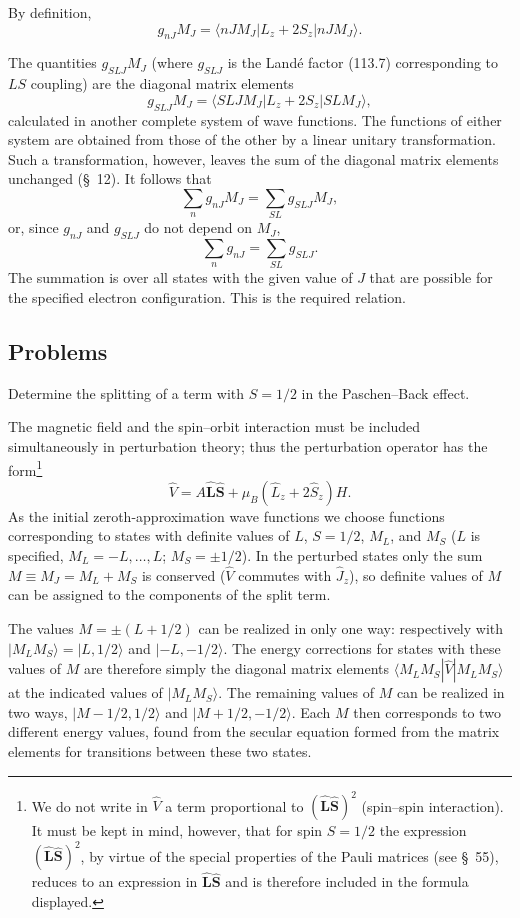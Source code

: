 By definition,
\[
 g_{nJ}M_J=\langle nJM_J|L_z+2S_z|nJM_J\rangle.
\]

The quantities $g_{SLJ}M_J$ (where $g_{SLJ}$ is the Landé factor (113.7) corresponding to $LS$ coupling) are the diagonal matrix elements
\[
 g_{SLJ}M_J=\langle SLJM_J|L_z+2S_z|SLM_J\rangle,
\]
calculated in another complete system of wave functions. The functions of either system are obtained from those of the other by a linear unitary transformation. Such a transformation, however, leaves the sum of the diagonal matrix elements unchanged (§~12). It follows that
\[
 \sum_n g_{nJ}M_J=\sum_{SL}g_{SLJ}M_J,
\]
or, since $g_{nJ}$ and $g_{SLJ}$ do not depend on $M_J$,
\begin{equation}
 \sum_n g_{nJ}=\sum_{SL}g_{SLJ}.
 \tag{113.16}
\end{equation}
The summation is over all states with the given value of $J$ that are possible for the specified electron configuration. This is the required relation.

\subsection*{Problems}

 Determine the splitting of a term with $S=1/2$ in the Paschen--Back effect.

\SolutionHeading The magnetic field and the spin--orbit interaction must be included simultaneously in perturbation theory; thus the perturbation operator has the form\footnote{We do not write in $\hat V$ a term proportional to $(\hat{\mathbf L}\hat{\mathbf S})^2$ (spin--spin interaction). It must be kept in mind, however, that for spin $S=1/2$ the expression $(\hat{\mathbf L}\hat{\mathbf S})^2$, by virtue of the special properties of the Pauli matrices (see §~55), reduces to an expression in $\hat{\mathbf L}\hat{\mathbf S}$ and is therefore included in the formula displayed.}
\[
 \hat V=A\hat{\mathbf L}\hat{\mathbf S}+\mu_B(\hat L_z+2\hat S_z)H.
\]
As the initial zeroth-approximation wave functions we choose functions corresponding to states with definite values of $L$, $S=1/2$, $M_L$, and $M_S$ ($L$ is specified, $M_L=-L,\ldots,L$; $M_S=\pm1/2$). In the perturbed states only the sum $M\equiv M_J=M_L+M_S$ is conserved ($\hat V$ commutes with $\hat J_z$), so definite values of $M$ can be assigned to the components of the split term.

The values $M=\pm(L+1/2)$ can be realized in only one way: respectively with $|M_LM_S\rangle=|L,1/2\rangle$ and $|-L,-1/2\rangle$. The energy corrections for states with these values of $M$ are therefore simply the diagonal matrix elements $\langle M_LM_S|\hat V|M_LM_S\rangle$ at the indicated values of $|M_LM_S\rangle$. The remaining values of $M$ can be realized in two ways, $|M-1/2,1/2\rangle$ and $|M+1/2,-1/2\rangle$. Each $M$ then corresponds to two different energy values, found from the secular equation formed from the matrix elements for transitions between these two states.

